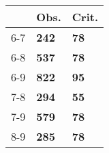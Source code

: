 \begin{table}[ht]
\centering
\begin{tabular}{rll}
  \hline
 & Obs. & Crit. \\ 
  \hline
6-7 & \textbf{242} & \textbf{78} \\ 
  6-8 & \textbf{537} & \textbf{78} \\ 
  6-9 & \textbf{822} & \textbf{95} \\ 
  7-8 & \textbf{294} & \textbf{55} \\ 
  7-9 & \textbf{579} & \textbf{78} \\ 
  8-9 & \textbf{285} & \textbf{78} \\ 
   \hline
\end{tabular}
\end{table}
